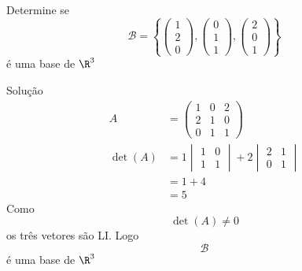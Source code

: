 \begin{question}
  Determine se
  \[
  \mathcal{B}=
  \left\{
  \begin{pmatrix}
  1\\2\\0
  \end{pmatrix}
  ,
  \begin{pmatrix}
  0\\1\\1
  \end{pmatrix}
  ,
  \begin{pmatrix}
  2\\0\\1
  \end{pmatrix}
  \right\}
  \]
  é uma base de $\R^{3}$
\end{question}

\begin{resolution}{Solução}
  \begin{align*}
  A&=
  \begin{pmatrix}
  1&0&2\\
  2&1&0\\
  0&1&1
  \end{pmatrix}\\
  \det(A)
  &=
  1
  \begin{vmatrix}
  1&0\\
  1&1
  \end{vmatrix}
  +
  2
  \begin{vmatrix}
  2&1\\
  0&1
  \end{vmatrix}\\
  &=1+4\\
  &=5
  \end{align*}
  Como
  \[
  \det(A)\neq0
  \]
  os três vetores são LI.
  Logo
  \[
  \mathcal{B}
  \]
  é uma base de $\R^{3}$
\end{resolution}

\endinput
